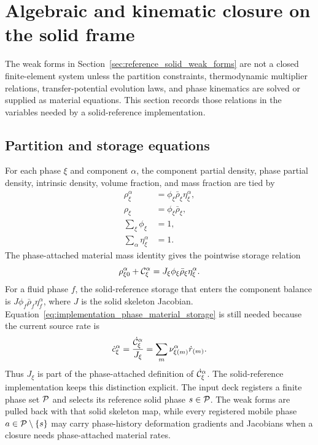 \section{Algebraic and kinematic closure on the solid frame}
\label{sec:algebraic_kinematic_closure}

The weak forms in Section~\ref{sec:reference_solid_weak_forms} are not a
closed finite-element system unless the partition constraints, thermodynamic
multiplier relations, transfer-potential evolution laws, and phase kinematics
are solved or supplied as material equations.  This section records those
relations in the variables needed by a solid-reference implementation.

\subsection{Partition and storage equations}
\label{sec:partition_storage_equations}

For each phase \(\xi\) and component \(\alpha\), the component partial density,
phase partial density, intrinsic density, volume fraction, and mass fraction
are tied by
\begin{subequations}
	\label{eq:implementation_partition_relations}
	\begin{align}
		\rho_\xi^\alpha
		 & =\phi_\xi\bar\rho_\xi\eta_\xi^\alpha,
		\label{eq:implementation_component_density_partition} \\
		\rho_\xi
		 & =\phi_\xi\bar\rho_\xi,
		\label{eq:implementation_phase_density_partition} \\
		\sum_\xi\phi_\xi
		 & =1,
		\label{eq:implementation_volume_partition} \\
		\sum_\alpha\eta_\xi^\alpha
		 & =1 .
		\label{eq:implementation_mass_fraction_partition}
	\end{align}
\end{subequations}
The phase-attached material mass identity gives the pointwise storage relation
\begin{equation}
	\rho_{\xi0}^\alpha+\mathcal{C}_\xi^\alpha
	=
	J_\xi\phi_\xi\bar\rho_\xi\eta_\xi^\alpha .
	\label{eq:implementation_phase_material_storage}
\end{equation}
For a fluid phase \(f\), the solid-reference storage that enters the component
balance is \(J\phi_f\bar\rho_f\eta_f^\alpha\), where \(J\) is the solid
skeleton Jacobian.  Equation~\eqref{eq:implementation_phase_material_storage}
is still needed because the current source rate is
\begin{equation}
	\dot c_\xi^\alpha
	=
	\frac{\dot{\mathcal{C}}_\xi^\alpha}{J_\xi}
	=
	\sum_m\nu_{\xi (m)}^\alpha\dot r_{(m)} .
	\label{eq:implementation_conversion_rate_constraint}
\end{equation}
Thus \(J_\xi\) is part of the phase-attached definition of
\(\dot{\mathcal{C}}_\xi^\alpha\).  The solid-reference implementation keeps this
distinction explicit.  The input deck registers a finite phase set \(\mathcal{P}\)
and selects its reference solid phase \(s\in\mathcal{P}\).  The weak forms are pulled
back with that solid skeleton map, while every registered mobile phase
\(a\in\mathcal{P}\setminus\{s\}\) may carry phase-history deformation gradients and
Jacobians when a closure needs phase-attached material rates.

